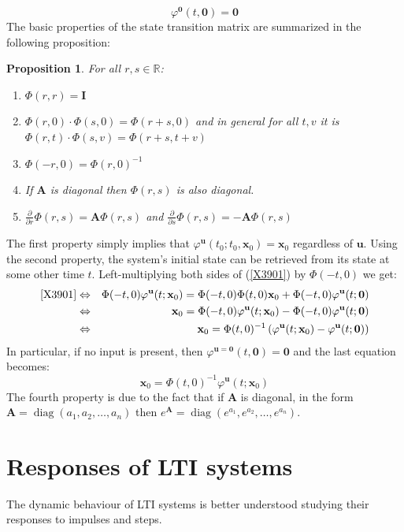 \documentclass[a4paper,10pt,oneside]{book}
\newtheorem{proposition}[theorem]{Proposition}
\begin{document}
\begin{equation}
 \varphi^{\mathbf{0}}(t,\mathbf{0})=\mathbf{0}
\end{equation}
The basic properties of the state transition matrix are summarized in the following proposition:
\begin{proposition}
 For all $r,s\in\mathbb{R}$:
\begin{enumerate}
 \item $\Phi(r,r)=\mathbf{I}$
 \item $\Phi(r,0)\cdot \Phi(s,0)=\Phi(r+s,0)$ and in general for all $t,v$ it is $\Phi(r,t)\cdot \Phi(s,v)=\Phi(r+s,t+v)$
 \item $\Phi(-r,0)=\Phi(r,0)^{-1}$
 \item If $\mathbf{A}$ is diagonal then $\Phi(r,s)$ is also diagonal.
 \item $\frac{\partial}{\partial r}\Phi(r,s)=\mathbf{A}\Phi(r,s)$ and $\frac{\partial}{\partial s}\Phi(r,s)=-\mathbf{A}\Phi(r,s)$
\end{enumerate}
\end{proposition}
The first property simply implies that $\varphi^{\mathbf{u}}(t_0;t_0,\mathbf{x}_0)=\mathbf{x}_0$ regardless of $\mathbf{u}$. Using the second property, the system's initial state can be retrieved from its state at some other time $t$. Left-multiplying both sides of (\ref{X3901}) by $\Phi(-t,0)$ we get:
\begin{eqnarray}
 \text{\ref{X3901}}&\Leftrightarrow&\Phi(-t,0)\varphi^{\mathbf{u}}(t;\mathbf{x}_0)=\Phi(-t,0)\Phi(t,0)\mathbf{x}_0+\Phi(-t,0)\varphi^{\mathbf{u}}(t;\mathbf{0})\\
&\Leftrightarrow&\mathbf{x}_0=\Phi(-t,0)\varphi^{\mathbf{u}}(t;\mathbf{x}_0)-\Phi(-t,0)\varphi^{\mathbf{u}}(t;\mathbf{0})\\
&\Leftrightarrow&\mathbf{x}_0=\Phi(t,0)^{-1}\left(\varphi^{\mathbf{u}}(t;\mathbf{x}_0)-\varphi^{\mathbf{u}}(t;\mathbf{0})\right)
\end{eqnarray}
In particular, if no input is present, then $\varphi^{\mathbf{u}=\mathbf{0}}(t,\mathbf{0})=\mathbf{0}$ and the last equation becomes:
\begin{equation}
 \mathbf{x}_0=\Phi(t,0)^{-1}\varphi^{\mathbf{u}}(t;\mathbf{x}_0)
\end{equation}
The fourth property is due to the fact that if $\mathbf{A}$ is diagonal, in the form $\mathbf{A}=\operatorname{diag}(a_1, a_2, \ldots, a_n)$ then $e^\mathbf{A}=\operatorname{diag}(e^{a_1}, e^{a_2}, \ldots, e^{a_n})$.

\section{Responses of LTI systems}
The dynamic behaviour of LTI systems is better understood studying their responses to impulses and steps. 
\end{document}
